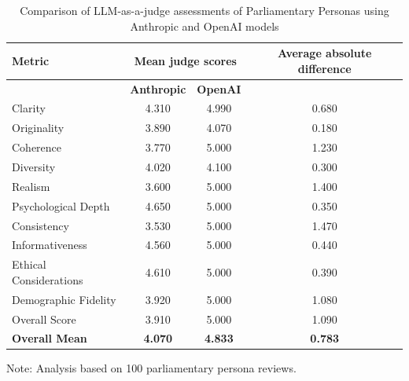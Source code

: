 \documentclass[11pt]{article}
\begin{document}
\begin{table}[htbp]
\centering
\caption{Comparison of LLM-as-a-judge assessments of Parliamentary Personas using Anthropic and OpenAI models}
\label{tab:parliamentary_persona_judge}
\begin{tabular}{lccc}
\toprule
\textbf{Metric} & \multicolumn{2}{c}{\textbf{Mean judge scores}} & \textbf{Average absolute difference} \\
\toprule
 & \textbf{Anthropic} & \textbf{OpenAI} & \\
\midrule
Clarity & 4.310 & 4.990 & 0.680 \\
Originality & 3.890 & 4.070 & 0.180 \\
Coherence & 3.770 & 5.000 & 1.230 \\
Diversity & 4.020 & 4.100 & 0.300 \\
Realism & 3.600 & 5.000 & 1.400 \\
Psychological Depth & 4.650 & 5.000 & 0.350 \\
Consistency & 3.530 & 5.000 & 1.470 \\
Informativeness & 4.560 & 5.000 & 0.440 \\
Ethical Considerations & 4.610 & 5.000 & 0.390 \\
Demographic Fidelity & 3.920 & 5.000 & 1.080 \\
Overall Score & 3.910 & 5.000 & 1.090 \\
\midrule
\textbf{Overall Mean} & \textbf{4.070} & \textbf{4.833} & \textbf{0.783} \\
\bottomrule
\end{tabular}
\begin{tablenotes}
\small
\item Note: Analysis based on 100 parliamentary persona reviews.
\end{tablenotes}
\end{table}




\end{document}
